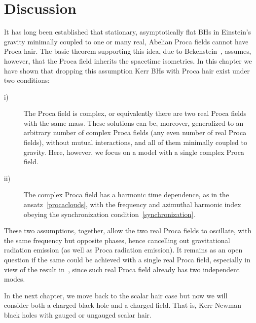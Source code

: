 \section{Discussion}
\label{sec_discussion}
It has long been established that stationary, asymptotically flat BHs in Einstein's gravity minimally coupled to one or many real, Abelian Proca fields cannot have Proca hair.
The basic theorem supporting this idea, due to Bekenstein~\cite{Bekenstein:1971hc,Bekenstein:1972ky}, assumes, however, that the Proca field inherits the spacetime isometries.
In this chapter we have shown that dropping this assumption Kerr BHs with Proca hair exist under two conditions:
\begin{description}
\item[i)] The Proca field is complex, or equivalently there are two real Proca fields with the same mass. These solutions can be, moreover, generalized to an arbitrary number of complex Proca fields (any even number of real Proca fields), without mutual interactions, and all of them minimally coupled to gravity. Here, however, we focus on a model with a single complex Proca field. 
\item[ii)] The complex Proca field has a harmonic time dependence, as in the ansatz~\eqref{procaclouds}, with the frequency and azimuthal harmonic index obeying the synchronization condition~\eqref{synchronization}.
\end{description}
These two assumptions, together, allow the two real Proca fields to oscillate, with the same frequency but opposite phases, hence cancelling out gravitational radiation emission (as well as Proca radiation emission).
It remains as an open question if the same could be achieved with a single real Proca field, especially in view of the result in~\cite{Wang:2015fgp}, since such real Proca field already has two independent modes. 

\bigskip

In the next chapter, we move back to the scalar hair case but now we will consider both a charged black hole and a charged field.
That is, Kerr-Newman black holes with gauged or ungauged scalar hair.
